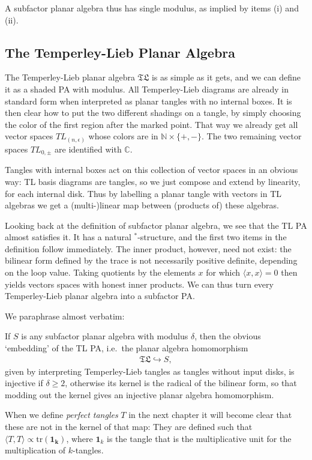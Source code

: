 A subfactor planar algebra thus has single modulus, as implied by items \textsf{(i)} and \textsf{(ii)}.

\subsection{The Temperley-Lieb Planar Algebra}
The Temperley-Lieb planar algebra $\mathfrak{TL}$ is as simple as it gets, and we can define it as a shaded PA with modulus. All Temperley-Lieb diagrams are already in standard form when interpreted as planar tangles with no internal boxes. It is then clear how to put the two different shadings on a tangle, by simply choosing the color of the first region after the marked point. That way we already get all vector spaces $TL_{(n,\epsilon)}$ whose colors are in $\mathbb{N}\times\{+,-\}$. The two remaining vector spaces $TL_{0,\pm}$ are identified with $\mathbb{C}$.

Tangles with internal boxes act on this collection of vector spaces in an obvious way: TL basis diagrams are tangles, so we just compose and extend by linearity, for each internal disk. Thus by labelling a planar tangle with vectors in TL algebras we get a (multi-)linear map between (products of) these algebras.

Looking back at the definition of subfactor planar algebra, we see that the TL PA almost satisfies it. It has a natural ${}^*$-structure, and the first two items in the definition follow immediately. The inner product, however, need not exist: the bilinear form defined by the trace is not necessarily positive definite, depending on the loop value. Taking quotients by the elements $x$ for which $\langle x,x \rangle=0$ then yields vectors spaces with honest inner products. We can thus turn every Temperley-Lieb planar algebra into a subfactor PA.

We paraphrase \cite{peters2010planar} almost verbatim:
\begin{fact}If $S$ is any subfactor planar algebra with modulus $\delta$, then the obvious `embedding' of the TL PA, i.e.\ the planar algebra homomorphism
\begin{align*}
\mathfrak{TL}\hookrightarrow S,
\end{align*}
given by interpreting Temperley-Lieb tangles as tangles without input disks, is injective if $\delta \geq 2$, otherwise its kernel is the radical of the bilinear form, so that modding out the kernel gives an injective planar algebra homomorphism.
\end{fact}
When we define \emph{perfect tangles} $T$ in the next chapter it will become clear that these are not in the kernel of that map: They are defined such that $\langle T,T \rangle \propto \mathrm{tr}(\mathbf{1_k})$, where $\mathbf{1}_k$ is the tangle that is the multiplicative unit for the multiplication of $k$-tangles.

